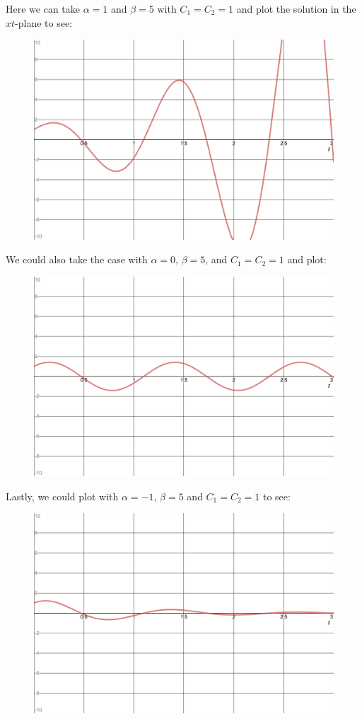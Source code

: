 \begin{itemize}
            Here we can take $\alpha = 1$ and $\beta =5$ with $C_1=C_2=1$ and plot the solution in the $xt$-plane to see:
            \begin{figure}[H]
                \centering
                \includegraphics[width=.7\textwidth]{Figures_Part_2/a=1-b=5.png}
            \end{figure}
            We could also take the case with $\alpha=0$, $\beta=5$, and $C_1=C_2=1$ and plot:
            \begin{figure}[H]
                \centering
                \includegraphics[width=.7\textwidth]{Figures_Part_2/a=0-b=5.png}
            \end{figure}
            Lastly, we could plot with $\alpha=-1$, $\beta =5$ and $C_1=C_2=1$ to see:
                        \begin{figure}[H]
                \centering
                \includegraphics[width=.7\textwidth]{Figures_Part_2/a=-1-b=5.png}
            \end{figure}
        \end{itemize}
        

